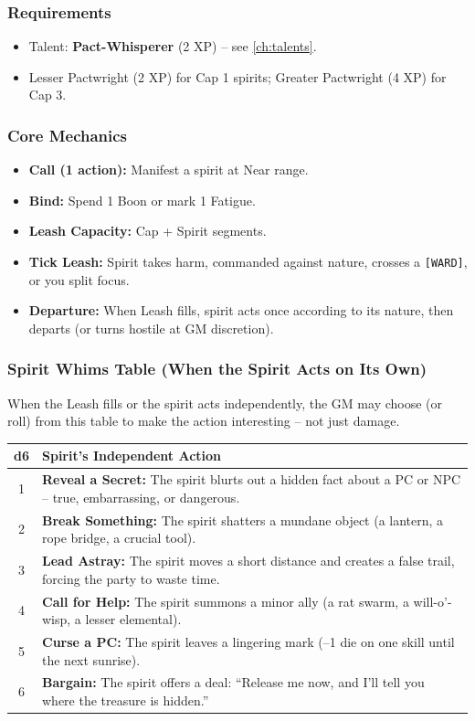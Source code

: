 \subsubsection*{Requirements}
\begin{itemize}
  \item Talent: \textbf{Pact-Whisperer} (2 XP) -- see \ref{ch:talents}.
  \item Lesser Pactwright (2 XP) for Cap 1 spirits; Greater Pactwright (4 XP) for Cap 3.
\end{itemize}

\subsubsection*{Core Mechanics}
\label{sec:summoning-mechanics}
\begin{itemize}
  \item \textbf{Call (1 action):} Manifest a spirit at Near range.
  \item \textbf{Bind:} Spend 1 Boon or mark 1 Fatigue.
  \item \textbf{Leash Capacity:} Cap + Spirit segments.
  \item \textbf{Tick Leash:} Spirit takes harm, commanded against nature, crosses a \texttt{[WARD]}, or you split focus.
  \item \textbf{Departure:} When Leash fills, spirit acts once according to its nature, then departs (or turns hostile at GM discretion).
\end{itemize}

\subsubsection*{Spirit Whims Table (When the Spirit Acts on Its Own)}
\label{sec:spirit-whims}
When the Leash fills or the spirit acts independently, the GM may choose (or roll) from this table to make the action interesting -- not just damage.

\begin{center}
\begin{tabular}{cl}
\toprule
\textbf{d6} & \textbf{Spirit's Independent Action} \\
\midrule
1 & \textbf{Reveal a Secret:} The spirit blurts out a hidden fact about a PC or NPC -- true, embarrassing, or dangerous. \\
2 & \textbf{Break Something:} The spirit shatters a mundane object (a lantern, a rope bridge, a crucial tool). \\
3 & \textbf{Lead Astray:} The spirit moves a short distance and creates a false trail, forcing the party to waste time. \\
4 & \textbf{Call for Help:} The spirit summons a minor ally (a rat swarm, a will-o'-wisp, a lesser elemental). \\
5 & \textbf{Curse a PC:} The spirit leaves a lingering mark (--1 die on one skill until the next sunrise). \\
6 & \textbf{Bargain:} The spirit offers a deal: ``Release me now, and I'll tell you where the treasure is hidden.'' \\
\bottomrule
\end{tabular}
\end{center}


